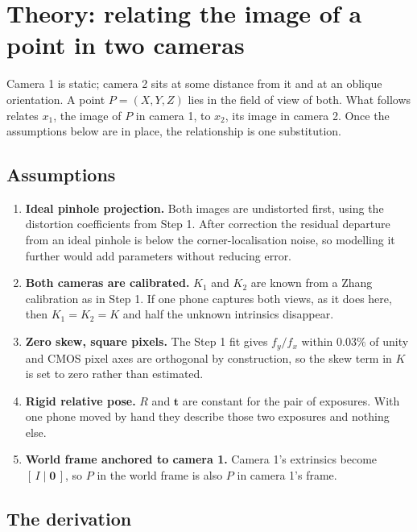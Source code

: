 \documentclass[11pt,a4paper]{article}
\begin{document}
\section{Theory: relating the image of a point in two cameras}

Camera 1 is static; camera 2 sits at some distance from it and at an oblique
orientation. A point $P = (X, Y, Z)$ lies in the field of view of both. What
follows relates $x_1$, the image of $P$ in camera 1, to $x_2$, its image in
camera 2. Once the assumptions below are in place, the relationship is one
substitution.

\subsection{Assumptions}

\begin{enumerate}
  \item \textbf{Ideal pinhole projection.} Both images are undistorted first,
        using the distortion coefficients from Step 1. After correction the
        residual departure from an ideal pinhole is below the
        corner-localisation noise, so modelling it further would add
        parameters without reducing error.
  \item \textbf{Both cameras are calibrated.} $K_1$ and $K_2$ are known from a
        Zhang calibration as in Step 1. If one phone captures both views, as
        it does here, then $K_1 = K_2 = K$ and half the unknown intrinsics
        disappear.
  \item \textbf{Zero skew, square pixels.} The Step 1 fit gives $f_y/f_x$
        within $0.03\%$ of unity and CMOS pixel axes are orthogonal by
        construction, so the skew term in $K$ is set to zero rather than
        estimated.
  \item \textbf{Rigid relative pose.} $R$ and $\mathbf{t}$ are constant for the
        pair of exposures. With one phone moved by hand they describe those two
        exposures and nothing else.
  \item \textbf{World frame anchored to camera 1.} Camera 1's
        extrinsics become $[\,I \mid \mathbf{0}\,]$, so $P$ in the world frame
        is also $P$ in camera 1's frame.
\end{enumerate}

\subsection{The derivation}
\end{document}

